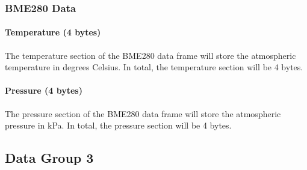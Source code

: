 \documentclass{article}
\begin{document}
  \subsubsection{BME280 Data}
  \paragraph{Temperature (4 bytes)}
  The temperature section of the BME280 data frame will store the atmospheric temperature in degrees Celsius. In total, the temperature section will be 4 bytes.
  \paragraph{Pressure (4 bytes)}
  The pressure section of the BME280 data frame will store the atmospheric pressure in kPa. In total, the pressure section will be 4 bytes.
  \subsection{Data Group 3}
  
  
\end{document}

